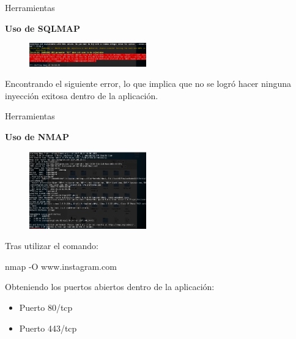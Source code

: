 \begin{frame}[t,fragile]{Herramientas}

\textbf{Uso de SQLMAP}

\begin{figure} 
\vspace{2pt}
  \begin{center}
    \includegraphics[width=0.45\textwidth]{errortest.png}
    \label{fig:databaseUserTable}
  \end{center}
  \vspace{2pt}
\end{figure} 

\bigskip

 Encontrando el siguiente error, lo que implica que no se logró hacer ninguna inyección exitosa dentro de la aplicación.

\end{frame}

\begin{frame}[t,fragile]{Herramientas}

\textbf{Uso de NMAP}

\begin{figure} 
\vspace{2pt}
  \begin{center}
    \includegraphics[width=0.45\textwidth]{nmap.png}
    \label{fig:databaseUserTable}
  \end{center}
  \vspace{2pt}
\end{figure} 

\bigskip

 Tras utilizar el comando:
 
 \begin{center}
     nmap -O www.instagram.com 
 \end{center}
 
Obteniendo los puertos abiertos dentro de la aplicación:

\begin{itemize}
    \item Puerto 80/tcp
    \item Puerto 443/tcp
\end{itemize}

\end{frame}


